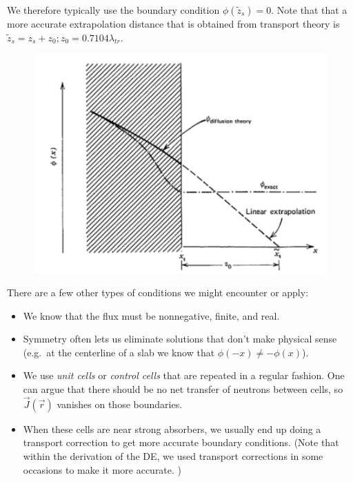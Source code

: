 \documentclass[12pt]{article}
\newcommand{\rvec}{\ensuremath{\vec{r}}}
\begin{document}
We therefore typically use the boundary condition $\phi(\tilde{z}_s) = 0$. 
Note that that a more accurate extrapolation distance that is obtained from transport theory is $\tilde{z}_s = z_s + z_0; z_0 = 0.7104 \lambda_{tr}$.

\begin{figure}
    \begin{center}
    \includegraphics[keepaspectratio, width = 3 in]{extrapolation}
    \end{center}
    \label{fig:phase_space}
\end{figure}

There are a few other types of conditions we might encounter or apply:
\begin{itemize}
\item We know that the flux must be nonnegative, finite, and real. 
\item Symmetry often lets us eliminate solutions that don't make physical sense (e.g.\ at the centerline of a slab we know that $\phi(-x) \neq - \phi(x)$). 
\item We use \textit{unit cells} or \textit{control cells} that are repeated in a regular fashion. 
One can argue that there should be no net transfer of neutrons between cells, so $\vec{J}(\rvec)$ vanishes on those boundaries.
\item When these cells are near strong absorbers, we usually end up doing a transport correction to get more accurate boundary conditions. 
(Note that within the derivation of the DE, we used transport corrections in some occasions to make it more accurate. )
\end{itemize}
\end{document}
